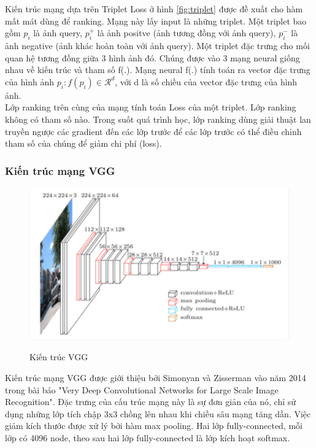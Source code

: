 \documentclass[a4paper,14pt]{extreport}
\begin{document}
Kiến trúc mạng dựa trên Triplet Loss ở hình \ref{fig:triplet} \cite{paper-5} được đề xuất cho hàm mất mát dùng để ranking. Mạng này lấy input là những triplet. Một triplet bao gồm $p_i$ là ảnh query, $p_i^{+}$ là ảnh positve (ảnh tương đồng với ảnh query), $p_i^{-}$ là ảnh negative (ảnh khác hoàn toàn với ảnh query). Một triplet đặc trưng cho mối quan hệ tương đồng giữa 3 hình ảnh đó. Chúng được vào 3 mạng neural giống nhau về kiến trúc và tham số f(.). Mạng neural f(.) tính toán ra vector đặc trưng của hình ảnh $p_i: f(p_i) \in \mathcal{R}^d$, với d là số chiều của vector đặc trưng của hình ảnh.
\\
Lớp ranking trên cùng của mạng tính toán Loss của một triplet. Lớp ranking không có tham số nào. Trong suốt quá trình học, lớp ranking dùng giải thuật lan truyền ngược các gradient đến các lớp trước để các lớp trước có thể điều chỉnh tham số của chúng để giảm chi phí (loss).

\subsubsection*{ Kiến trúc mạng VGG }

\begin{figure}  
    \centering
    \includegraphics[scale=0.8]{img/vgg.png}
    \caption{Kiến trúc VGG}
    \cite{img-vgg}
    \label{fig:vgg}
\end{figure}

Kiến trúc mạng VGG được giới thiệu bởi Simonyan và Zisserman vào năm 2014 trong bài báo "Very Deep Convolutional Networks for Large Scale Image Recognition". Đặc trưng của cấu trúc mạng này là sự đơn giản của nó, chỉ sử dụng những lớp tích chập 3x3 chồng lên nhau khi chiều sâu mạng tăng dần. Việc giảm kích thước được xử lý bởi hàm max pooling. Hai lớp fully-connected, mỗi lớp có 4096 node, theo sau hai lớp fully-connected là lớp kích hoạt softmax.
\end{document}
